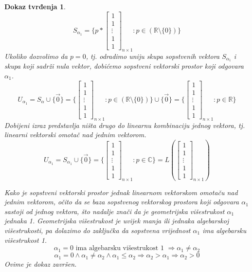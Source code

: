 \documentclass[11pt]{article}
\newtheorem*{custom_proof}{Dokaz tvrđenja}
\begin{document}
\begin{custom_proof}
	\[
	S_{\alpha_1} = \{p *
	\begin{bmatrix} 
	1 \\ 1 \\ \vdots \\ 1 \\ 1
	\end{bmatrix}_{n \times 1} : p \in (\mathbb{R} \setminus \{0\}) \} 
	\]
	Ukoliko dozvolimo da $p=0$, tj. odradimo uniju skupa sopstvenih vektora $S_{\alpha_1}$ i skupa koji sadrži nula vektor,
	dobićemo sopstveni vektorski prostor koji odgovara $\alpha_1$.
	\[
	U_{\alpha_1} = S_{\alpha} \cup \{\vec{0}\}= \{
	\begin{bmatrix} 
	1 \\ 1 \\ \vdots \\ 1 \\ 1
	\end{bmatrix}_{n \times 1}  : p \in (\mathbb{R} \setminus \{0\}) \} \cup \{\vec{0}\}= \{
	\begin{bmatrix} 
	1 \\ 1 \\ \vdots \\ 1 \\ 1
	\end{bmatrix}_{n \times 1} :  p \in \mathbb{R}\} 
	\]
	Dobijeni izraz predstavlja ništa drugo do linearnu kombinaciju jednog vektora, tj. linearni vektorski omotač nad jednim vektorom.
	\[
	U_{\alpha_1} = S_{\alpha_1} \cup \{\vec{0}\}= \{
	\begin{bmatrix} 
	1 \\ 1 \\ \vdots \\ 1 \\ 1
	\end{bmatrix}_{n \times 1} :  p \in \mathbb{C}\} = L (\begin{bmatrix} 
	1 \\ 1 \\ \vdots \\ 1 \\ 1
	\end{bmatrix}_{n \times 1})
	\]

	Kako je sopstveni vektorski prostor jednak linearnom vektorskom omotaču nad jednim vektorom, 
	očito da se baza sopstvenog vektorskog prostora koji odgovara $\alpha_1$ sastoji od jednog vektora,
	što nadalje znači da je geometrijska višestrukost $\alpha_1$ jednaka 1.
	Geometrijska višestrukost je uvijek manja ili jednaka algebarskoj višestrukosti,
	pa dolazimo do zaključka da sopstvena vrijednost $\alpha_1$ ima algebarsku višestrukost 1.
	\[
	\alpha_1 = 0 \text{ ima algebarsku višestrukost 1 } \Rightarrow \alpha_1 \neq \alpha_2
	\]
	\[
	\alpha_1 = 0  \land \alpha_1 \neq \alpha_2 \land \alpha_1 \leq \alpha_2 \Rightarrow \alpha_2 > \alpha_1 \Rightarrow \alpha_2 > 0
	\]
	Ovime je dokaz završen.
	\end{custom_proof}
	
\end{document}
